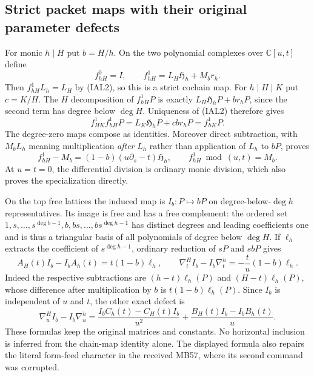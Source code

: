 \documentclass[11pt,a4paper]{article}
\theoremstyle{definition}
\begin{document}
\subsection{Strict packet maps with their original parameter defects}
For monic $h\mid H$ put $b=H/h$.  On the two polynomial complexes
over $\mathbb C[u,t]$ define
\begin{equation}
 f_{hH}^0=I,\qquad
 f_{hH}^1=L_H\mathfrak H_h+M_b r_h.                   \tag{IAL39}
\end{equation}
Then $f_{hH}^1L_h=L_H$ by (IAL2), so this is a strict cochain map.
For $h\mid H\mid K$ put $c=K/H$.  The $H$ decomposition of
$f_{hH}^1P$ is exactly $L_H\mathfrak H_hP+b r_hP$, since the second
term has degree below $\deg H$.  Uniqueness of (IAL2) therefore gives
\begin{equation}
 f_{HK}^1f_{hH}^1P=L_K\mathfrak H_hP+cb r_hP=f_{hK}^1P.
                                                        \tag{IAL40}
\end{equation}
The degree-zero maps compose as identities.  Moreover direct
subtraction, with $M_b L_h$ meaning multiplication \emph{after}
$L_h$ rather than application of $L_h$ to $bP$, proves
\begin{equation}
 f_{hH}^1-M_b=(1-b)(u\partial_s-t)\mathfrak H_h,
 \qquad f_{hH}^1\bmod(u,t)=M_b.                       \tag{IAL41}
\end{equation}
At $u=t=0$, the differential division is ordinary monic division,
which also proves the specialization directly.

On the top free lattices the induced map is $I_b:P\mapsto bP$ on
degree-below-$\deg h$ representatives.  Its image is free and has
a free complement: the ordered set
$1,s,\ldots,s^{\deg b-1},b,bs,\ldots,bs^{\deg h-1}$ has distinct
degrees and leading coefficients one and is thus a triangular basis
of all polynomials of degree below $\deg H$.  If $\ell_h$ extracts
the coefficient of $s^{\deg h-1}$, ordinary reduction of $sP$ and
$sbP$ gives
\begin{equation}
 A_H(t)I_b-I_bA_h(t)=t(1-b)\ell_h,\qquad
 \nabla_t^H I_b-I_b\nabla_t^h=-\frac{t}{u}(1-b)\ell_h.
                                                        \tag{IAL42}
\end{equation}
Indeed the respective subtractions are $(h-t)\ell_h(P)$ and
$(H-t)\ell_h(P)$, whose difference after multiplication by $b$ is
$t(1-b)\ell_h(P)$.  Since $I_b$ is independent of $u$ and $t$,
the other exact defect is
\begin{equation}
 \nabla_u^H I_b-I_b\nabla_u^h
 =\frac{I_bC_h(t)-C_H(t)I_b}{u^2}
       +\frac{B_H(t)I_b-I_bB_h(t)}{u}.                \tag{IAL43}
\end{equation}
These formulas keep the original matrices and constants.  No
horizontal inclusion is inferred from the chain-map identity alone.
The displayed formula also repairs the literal form-feed character
in the received MB57, where its second \texttt{\string\frac} command
was corrupted.
\end{document}
